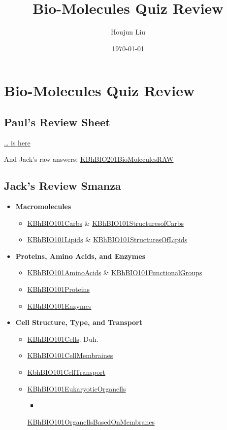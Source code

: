 \documentclass[letterpaper]{article}
\author{Houjun Liu}
\date{\today}
\title{Bio-Molecules Quiz Review}
\renewcommand{\tableofcontents}{}
\begin{document}
\tableofcontents



\section{Bio-Molecules Quiz Review}
\label{sec:org7ff2d3e}
\subsection{Paul's Review Sheet}
\label{sec:org0c3cb12}
\href{https://docs.google.com/document/d/1wGN3RNZCN-hkP2gJe2C7FHGZi\_-YfCE6aJCZy-0N53s/edit}{\ldots{}
is here}

And Jack's raw answers:
\href{KBhBIO201BioMoleculesRAW.org}{KBhBIO201BioMoleculesRAW}

\subsection{Jack's Review Smanza}
\label{sec:org03676e0}
\begin{itemize}
\item \textbf{Macromolecules}

\begin{itemize}
\item \href{KBhBIO101Carbs.org}{KBhBIO101Carbs} \&
\href{KBhBIO101StructuresofCarbs.org}{KBhBIO101StructuresofCarbs}
\item \href{KBhBIO101Lipids.org}{KBhBIO101Lipids} \&
\href{KBhBIO101StructuresOfLipids.org}{KBhBIO101StructuresOfLipids}
\end{itemize}

\item \textbf{Proteins, Amino Acids, and Enzymes}

\begin{itemize}
\item \href{KBhBIO101AminoAcids.org}{KBhBIO101AminoAcids} \&
\href{KBhBIO101FunctionalGroups.org}{KBhBIO101FunctionalGroups}
\item \href{KBhBIO101Proteins.org}{KBhBIO101Proteins}
\item \href{KBhBIO101Enzymes.org}{KBhBIO101Enzymes}
\end{itemize}

\item \textbf{Cell Structure, Type, and Transport}

\begin{itemize}
\item \href{KBhBIO101Cells.org}{KBhBIO101Cells}. Duh.
\item \href{KBhBIO101CellMembraines.org}{KBhBIO101CellMembraines}
\item \href{KbhBIO101CellTransport.org}{KbhBIO101CellTransport}
\item \href{KBhBIO101EukaryoticOrganells.org}{KBhBIO101EukaryoticOrganells}
\begin{itemize}
\item 
\end{itemize}
\href{KBhBIO101OrganellsBasedOnMembranes.org}{KBhBIO101OrganellsBasedOnMembranes}
\end{itemize}
\end{itemize}
\end{document}
